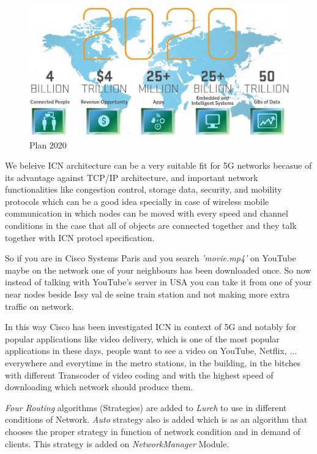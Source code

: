 \begin{figure}[H]

\begin{center}

\includegraphics[scale = 0.31]{Pictures/2020.jpg}

\caption{Plan 2020} \label{2020} 

\end{center}

\end{figure}


 We beleive ICN architecture can be a very suitable fit for 5G networks becasue of its advantage against TCP/IP architecture, and important network functionalities like congestion control, storage data, security, and mobility protocols which can be a good idea specially in case of wireless mobile communication in which nodes can be moved with every speed and channel conditions in the case that all of objects are connected together and they talk together with ICN protocl specification.

So if you are in Cisco Systems Paris and you search \textit{'movie.mp4'} on YouTube maybe on the network one of your neighbours has been downloaded once. So now instead of talking with YouTube's server in USA you can take it from one of your near nodes beside Issy val de seine train station and not making more extra traffic on network.


In this way Cisco has been investigated ICN in context of 5G and notably for popular applications like video delivery, which is one of the most popular applications in these days, people want to see a video on YouTube, Netflix, ... everywhere and everytime in the metro stations, in the building, in the bitches with different Transcoder of video coding and with the highest speed of downloading which network should produce them.

\textit{Four Routing} algorithms (Strategies) are added to \textit{Lurch} to use in different conditions of Network. \textit{Auto} strategy also is added which is as an algorithm that chooses the proper strategy in function of network condition and in demand of clients. This strategy is added on \textit{NetworkManager} Module.








